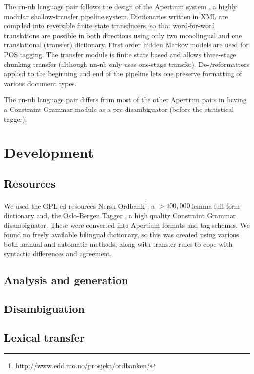 \documentclass[11pt]{article}
\begin{document}
The nn-nb language pair follows the design of the Apertium system
\citep{corbi05oss}, a highly modular shallow-transfer pipeline
system. Dictionaries written in XML are compiled into reversible
finite state transducers, so that word-for-word translations are
possible in both directions using only two monolingual and one
translational (transfer) dictionary. First order hidden Markov models
are used for POS tagging. The transfer module is finite state based
and allows three-stage chunking transfer (although nn-nb only uses
one-stage transfer). De-/reformatters applied to the beginning and end
of the pipeline lets one preserve formatting of various document
types.

The nn-nb language pair differs from most of the other Apertium pairs
in having a Constraint Grammar module as a pre-disambiguator (before
the statistical tagger).


\section{Development}
\label{sec-3}

\subsection{Resources}
\label{sec-3.1}

We used the GPL-ed resources Norsk Ordbank\footnote{\href{http://www.edd.uio.no/prosjekt/ordbanken/}{http://www.edd.uio.no/prosjekt/ordbanken/} }, a $>100,000$ lemma
full form dictionary and, the Oslo-Bergen Tagger \citep{hagen2000cbt},
a high quality Constraint Grammar disambiguator. These were converted
into Apertium formats and tag schemes. We found no freely available
bilingual dictionary, so this was created using various both manual
and automatic methods, along with transfer rules to cope with
syntactic differences and agreement.

\subsection{Analysis and generation}
\label{sec-3.2}


\subsection{Disambiguation}
\label{sec-3.3}


\subsection{Lexical transfer}
\label{sec-3.4}
\end{document}
